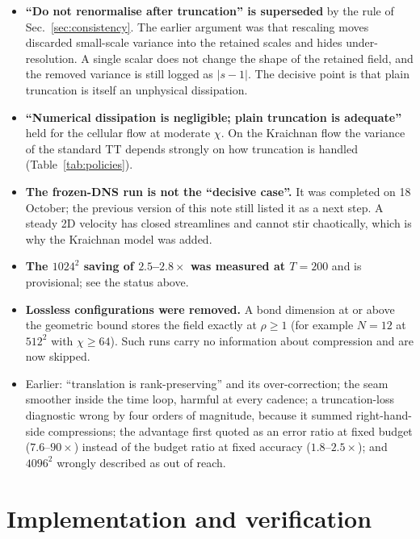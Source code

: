 \documentclass[aps,prfluids,reprint,onecolumn,amsmath,amssymb,nofootinbib,floatfix]{revtex4-2}
\begin{document}
\begin{itemize}
\item \textbf{``Do not renormalise after truncation'' is superseded} by the rule
      of Sec.~\ref{sec:consistency}. The earlier argument was that rescaling
      moves discarded small-scale variance into the retained scales and hides
      under-resolution. A single scalar does not change the shape of the
      retained field, and the removed variance is still logged as $|s-1|$. The
      decisive point is that plain truncation is itself an unphysical
      dissipation.
\item \textbf{``Numerical dissipation is negligible; plain truncation is
      adequate''} held for the cellular flow at moderate $\chi$. On the
      Kraichnan flow the variance of the standard TT depends strongly on how
      truncation is handled (Table~\ref{tab:policies}).
\item \textbf{The frozen-DNS run is not the ``decisive case''.} It was
      completed on 18 October; the previous version of this note still listed it
      as a next step. A steady 2D velocity has closed streamlines and cannot stir
      chaotically, which is why the Kraichnan model was added.
\item \textbf{The $1024^2$ saving of $2.5$--$2.8\times$ was measured at
      $T=200$} and is provisional; see the status above.
\item \textbf{Lossless configurations were removed.} A bond dimension at or above
      the geometric bound stores the field exactly at $\rho\ge1$ (for example
      $N=12$ at $512^2$ with $\chi\ge64$). Such runs carry no information about
      compression and are now skipped.
\item Earlier: ``translation is rank-preserving'' and its over-correction; the
      seam smoother inside the time loop, harmful at every cadence; a
      truncation-loss diagnostic wrong by four orders of magnitude, because it
      summed right-hand-side compressions; the advantage first quoted as an
      error ratio at fixed budget ($7.6$--$90\times$) instead of the budget ratio
      at fixed accuracy ($1.8$--$2.5\times$); and $4096^2$ wrongly described as
      out of reach.
\end{itemize}

\appendix

\section{Implementation and verification}
\end{document}
